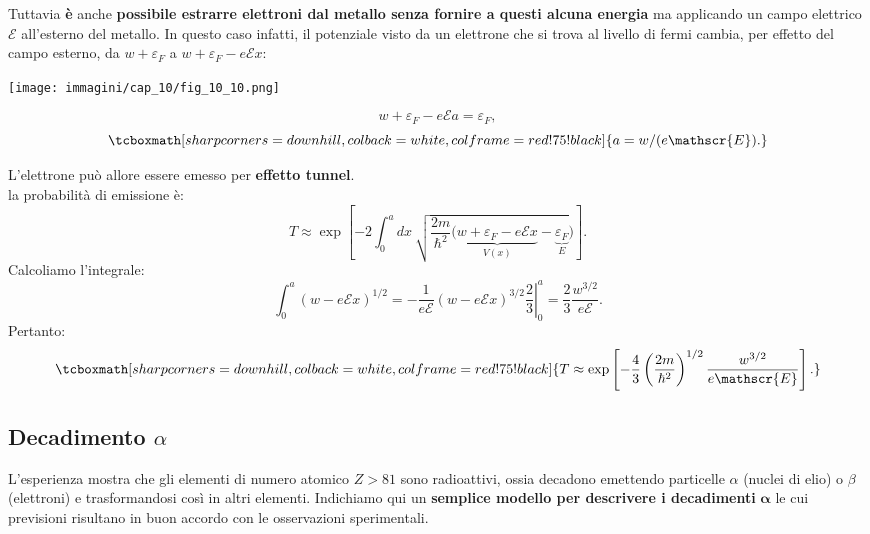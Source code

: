 Tuttavia \textbf{è} anche \textbf{possibile estrarre elettroni dal metallo senza fornire a questi alcuna energia} ma applicando un campo elettrico $\mathscr{E}$ all'esterno del metallo. In questo caso infatti, il potenziale visto da un elettrone che si trova al livello di fermi cambia, per effetto del campo esterno, da $w+\varepsilon _F$ a $w+\varepsilon _F-e\mathscr{E}x$:\\
\vspace{.5cm}
\begin{minipage}{.6\textwidth}
\texttt{[image: immagini/cap\_10/fig\_10\_10.png]}
\end{minipage}
\begin{minipage}{.4\textwidth}
\begin{equation}
w+\varepsilon _F-e\mathscr{E}a=\varepsilon _F ,
\end{equation}
\begin{equation}
\tcboxmath[sharp corners=downhill, colback=white, colframe=red!75!black]{
a= w/(e\mathscr{E}) .
}
\end{equation}
\end{minipage}
L'elettrone può allore essere emesso per \textbf{effetto tunnel}.\\
la probabilità di emissione è:
	\begin{equation}
		T \approx \exp \left[-2 \int_{0} ^{a} dx\ \sqrt{\frac{2m}{\hbar ^2} (\underbrace{w+\varepsilon _F-e\mathscr{E}x}_{V(x)}-\underbrace{\varepsilon _F}_{E}})\right].
	\end{equation}
Calcoliamo l'integrale:
	\begin{equation}
		\int _{0} ^{a} \left( w-e\mathscr{E}x \right) ^{1/2}= \left. -\frac{1}{e\mathscr{E}}\left( w-e\mathscr{E}x \right) ^{3/2}\frac{2}{3}\right| _0 ^a =\frac{2}{3}\frac{w^{3/2}}{e\mathscr{E}}.
	\end{equation}
Pertanto:
	\begin{equation}
		\tcboxmath[sharp corners=downhill, colback=white, colframe=red!75!black]{
		T \approx \exp \left[-\frac{4}{3}\left(\frac{2m}{\hbar ^2}\right)^{1/2}\frac{w^{3/2}}{e\mathscr{E}}\right].
		}
	\end{equation}
\subsection{Decadimento $\alpha$}
L'esperienza mostra che gli elementi di numero atomico $Z>81$ sono radioattivi, ossia decadono emettendo particelle $\alpha$ (nuclei di elio) o $\beta$ (elettroni) e trasformandosi così in altri elementi. Indichiamo qui un \textbf{semplice modello per descrivere i decadimenti} $\mathbf{\alpha}$ le cui previsioni risultano in buon accordo con le osservazioni sperimentali.\\

